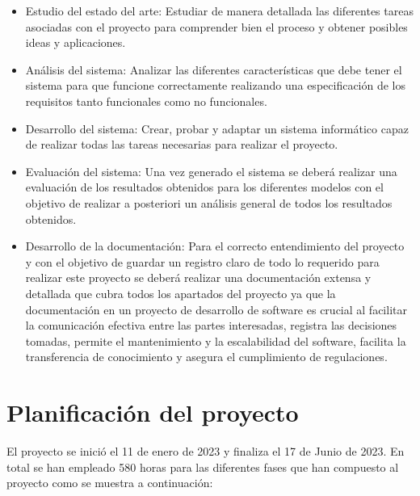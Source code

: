 \begin{itemize}
    \item Estudio del estado del arte: Estudiar de manera detallada las diferentes tareas asociadas con el proyecto para comprender bien el proceso y obtener posibles ideas y aplicaciones.
    \item Análisis del sistema: Analizar las diferentes características que debe tener el sistema para que funcione correctamente realizando una especificación de los requisitos tanto funcionales como no funcionales.
    \item Desarrollo del sistema: Crear, probar y adaptar un sistema informático capaz de realizar todas las tareas necesarias para realizar el proyecto.
    \item Evaluación del sistema: Una vez generado el sistema se deberá realizar una evaluación de los resultados obtenidos para los diferentes modelos con el objetivo de realizar a posteriori un análisis general de todos los resultados obtenidos.
    \item Desarrollo de la documentación: Para el correcto entendimiento del proyecto y con el objetivo de guardar un registro claro de todo lo requerido para realizar este proyecto se deberá realizar una documentación extensa y detallada que cubra todos los apartados del proyecto ya que la documentación en un proyecto de desarrollo de software es crucial al facilitar la comunicación efectiva entre las partes interesadas, registra las decisiones tomadas, permite el mantenimiento y la escalabilidad del software, facilita la transferencia de conocimiento y asegura el cumplimiento de regulaciones.
\end{itemize}

\section{Planificación del proyecto}

El proyecto se inició el 11 de enero de 2023 y finaliza el 17 de Junio de 2023. En total se han empleado 580 horas para las diferentes fases que han compuesto al proyecto como se muestra a continuación:

